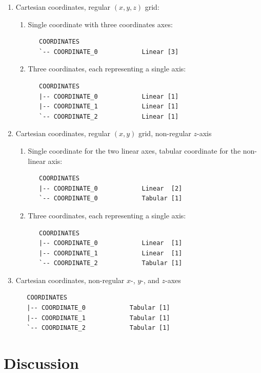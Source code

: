 \documentclass[a4paper,10pt,bibtotoc]{scrreprt}
\begin{document}
\begin{enumerate}
\item Cartesian coordinates, regular $(x,y,z)$ grid:
  \begin{enumerate}
  \item Single coordinate with three coordinates axes:
    \begin{lstlisting}
   COORDINATES
   `-- COORDINATE_0            Linear [3]
    \end{lstlisting}
  \item Three coordinates, each representing a single axis:
    \begin{lstlisting}
   COORDINATES
   |-- COORDINATE_0            Linear [1]
   |-- COORDINATE_1            Linear [1]
   `-- COORDINATE_2            Linear [1]
    \end{lstlisting}
  \end{enumerate}
\item Cartesian coordinates, regular $(x,y)$ grid, non-regular $z$-axis
  \begin{enumerate}
  \item Single coordinate for the two linear axes, tabular coordinate
    for the non-linear axis:
    \begin{lstlisting}
   COORDINATES
   |-- COORDINATE_0            Linear  [2]
   `-- COORDINATE_0            Tabular [1]
   \end{lstlisting}
  \item Three coordinates, each representing a single axis:
    \begin{lstlisting}
   COORDINATES
   |-- COORDINATE_0            Linear  [1]
   |-- COORDINATE_1            Linear  [1]
   `-- COORDINATE_2            Tabular [1]
    \end{lstlisting}
  \end{enumerate}
\item Cartesian coordinates, non-regular $x$-, $y$-, and $z$-axes
  \begin{lstlisting}
   COORDINATES
   |-- COORDINATE_0            Tabular [1]
   |-- COORDINATE_1            Tabular [1]
   `-- COORDINATE_2            Tabular [1]
  \end{lstlisting}
\end{enumerate}


\chapter{Discussion}
\label{sec:discussion}
\end{document}
